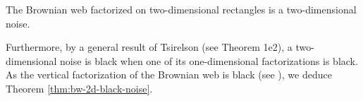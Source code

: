 {\begin{proposition*}
The Brownian web factorized on two-dimensional
rectangles is a two-dimensional noise.
\end{proposition*}

Furthermore, by a general result
of Tsirelson (see
\cite{tsirelson-noise-as-a-boolean-algebra} Theorem 1e2),
a two-dimensional noise is black when
one of its one-dimensional factorizations is
black. As the vertical factorization of
the Brownian web is black (see
\cite{tsirelson-nonclassical-stochastic-flows}),
we deduce Theorem \ref{thm:bw-2d-black-noise}.
}
